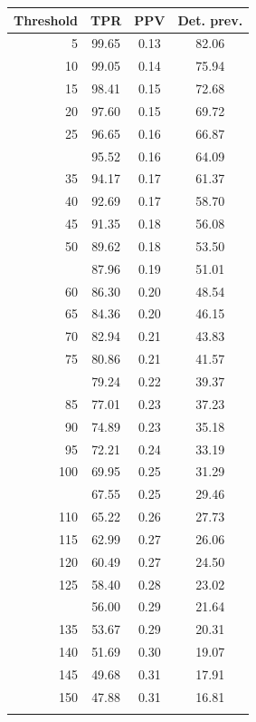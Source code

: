 \documentclass[12pt]{article}
\begin{document}
\begin{minipage}{0.5\textwidth}\small
\begin{tabular}{rccc}
\toprule
\textbf{Threshold} & \textbf{TPR} 
& \textbf{PPV} & \textbf{Det. prev.} \\
\midrule

      5 & 99.65 & 0.13 & 82.06 \\ 
     10 & 99.05 & 0.14 & 75.94 \\ 
     15 & 98.41 & 0.15 & 72.68 \\ 
     20 & 97.60 & 0.15 & 69.72 \\ 
     25 & 96.65 & 0.16 & 66.87 \\ \addlinespace
     30 & 95.52 & 0.16 & 64.09 \\ 
     35 & 94.17 & 0.17 & 61.37 \\ 
     40 & 92.69 & 0.17 & 58.70 \\ 
     45 & 91.35 & 0.18 & 56.08 \\ 
     50 & 89.62 & 0.18 & 53.50 \\  \addlinespace
     55 & 87.96 & 0.19 & 51.01 \\ 
     60 & 86.30 & 0.20 & 48.54 \\ 
     65 & 84.36 & 0.20 & 46.15 \\ 
     70 & 82.94 & 0.21 & 43.83 \\ 
     75 & 80.86 & 0.21 & 41.57 \\  \addlinespace
     80 & 79.24 & 0.22 & 39.37 \\ 
     85 & 77.01 & 0.23 & 37.23 \\ 
     90 & 74.89 & 0.23 & 35.18 \\ 
     95 & 72.21 & 0.24 & 33.19 \\ 
    100 & 69.95 & 0.25 & 31.29 \\  \addlinespace
    105 & 67.55 & 0.25 & 29.46 \\ 
    110 & 65.22 & 0.26 & 27.73 \\ 
    115 & 62.99 & 0.27 & 26.06 \\ 
    120 & 60.49 & 0.27 & 24.50 \\ 
    125 & 58.40 & 0.28 & 23.02 \\  \addlinespace
    130 & 56.00 & 0.29 & 21.64 \\ 
    135 & 53.67 & 0.29 & 20.31 \\ 
    140 & 51.69 & 0.30 & 19.07 \\ 
    145 & 49.68 & 0.31 & 17.91 \\ 
    150 & 47.88 & 0.31 & 16.81 \\  \addlinespace

\end{tabular}
\end{minipage}
\end{document}
